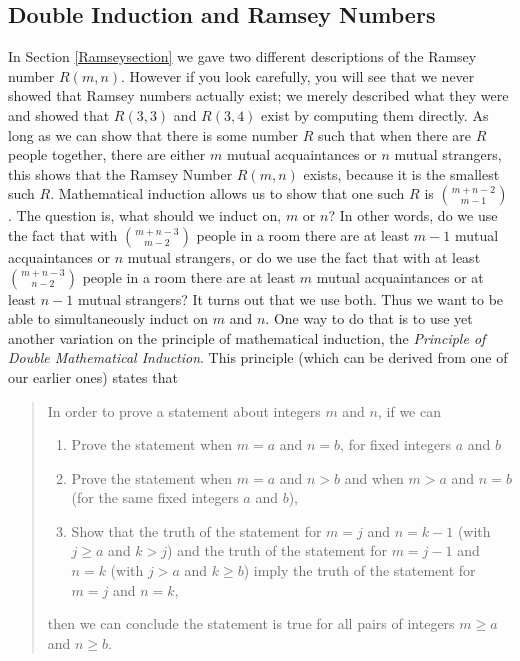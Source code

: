 \subsection{Double Induction and Ramsey Numbers}
In Section \ref{Ramseysection} we gave two different descriptions of the
Ramsey number $R(m,n)$.  However if you look carefully, you will see that
we never showed that Ramsey numbers actually exist; we merely described
what they were and showed that $R(3,3)$ and $R(3,4)$ exist by computing
them directly.  As long as we can show that there is some number $R$ such
that when there are $R$ people together, there are either $m$ mutual
acquaintances or $n$ mutual strangers, this shows that the Ramsey Number
$R(m,n)$ exists, because it is the smallest such $R$.  Mathematical
induction allows us to show that one such $R$ is $m+n-2\choose m-1$.  The
question is, what should we induct on, $m$ or $n$?  In other words, do we
use the fact that with $m+n-3\choose m-2 $ people in a room there are at
least $m-1$ mutual acquaintances or $n$ mutual strangers, or do we use
the fact that with at least $m+n-3\choose n-2$ people in a room there are
at least $m$ mutual acquaintances or at least $n-1$ mutual strangers?  It
turns out that we use both.  Thus we want to be able to simultaneously
induct on $m$ and $n$.  One way to do that is to use yet another
variation on the principle of mathematical induction, the {\em Principle
of Double Mathematical Induction}.
This principle (which can be derived from one of our earlier ones) states
that
\begin{quote}In order to prove a statement about  integers $m$ and $n$, if
we can
\begin{enumerate}
\item Prove the statement when $m=a$ and $n=b$, for  fixed integers $a$
and
$b$
\item Prove the statement when $m=a$ and $n>b$ and when $m>a$  and $n=b$
(for the same fixed integers $a$ and $b$), 
\item Show that the truth of the statement for $m=j$ and $n=k-1$ (with
$j\ge a$ and $k>j$) and the truth of the statement for $m=j-1$ and $n=k$
(with $j>a$ and $k\ge b$) imply the truth of the statement for $m=j$ and
$n=k$,
\end{enumerate}
then we can conclude the statement is true for all pairs of integers $m\ge
a$ and
$n\ge b$.\end{quote}

